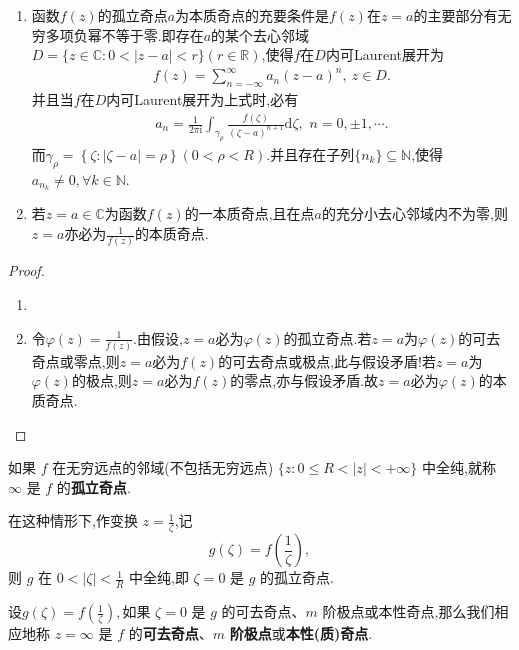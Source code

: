 \documentclass[../../main.tex]{subfiles}%
\begin{document}
\begin{theorem}
\begin{enumerate}[(1)]
\item 函数$f(z)$的孤立奇点$a$为本质奇点的充要条件是$f(z)$在$z=a$的主要部分有无穷多项负幂不等于零.即存在$a$的某个去心邻域$D=\{z\in \mathbb{C} :0<\left| z-a \right|<r\}(r\in \mathbb{R} )$,使得\( f \)在$D$内可Laurent展开为
\begin{align*}
f(z)=\sum_{n=-\infty}^{\infty}{a_n (z-a)^n},\ z\in D.
\end{align*}
并且当\( f \)在$D$内可Laurent展开为上式时,必有
\begin{align*}
a_n=\frac{1}{2\pi \mathrm{i}}\int_{\gamma _{\rho}}{\frac{f\left( \zeta \right)}{(\zeta-a)^{n+1}}\mathrm{d}\zeta},\,\,n=0,\pm 1,\cdots .
\end{align*}
而$\gamma _{\rho}=\left\{ \zeta :\left| \zeta-a \right|=\rho \right\}(0<\rho <R) .$并且存在子列$\{n_k\}\subseteq \mathbb{N}$,使得$a_{n_k}\neq 0,\forall k\in \mathbb{N}.$

\item 若$z=a\in \mathbb{C}$为函数$f(z)$的一本质奇点,且在点$a$的充分小去心邻域内不为零,则$z=a$亦必为$\frac{1}{f(z)}$的本质奇点.
\end{enumerate}
\end{theorem}
\begin{proof}
\begin{enumerate}[(1)]
\item 
    
\item 令$\varphi(z)=\frac{1}{f(z)}$.由假设,$z=a$必为$\varphi(z)$的孤立奇点.若$z=a$为$\varphi(z)$的可去奇点或零点,则$z=a$必为$f(z)$的可去奇点或极点,此与假设矛盾!若$z=a$为$\varphi(z)$的极点,则$z=a$必为$f(z)$的零点,亦与假设矛盾.故$z=a$必为$\varphi(z)$的本质奇点.
\end{enumerate}
\end{proof}

\begin{definition}
如果 \( f \) 在无穷远点的邻域(不包括无穷远点) \( \{ z: 0 \leqslant R < |z| < +\infty \} \) 中全纯,就称 \( \infty \) 是 \( f \) 的\textbf{孤立奇点}.
\end{definition}
\begin{remark}
在这种情形下,作变换 \( z = \frac{1}{\zeta} \),记
\[
g(\zeta) = f\left( \frac{1}{\zeta} \right),
\]
则 \( g \) 在 \( 0 < |\zeta| < \frac{1}{R} \) 中全纯,即 \( \zeta = 0 \) 是 \( g \) 的孤立奇点.
\end{remark}

\begin{definition}
设$g(\zeta) = f\left( \frac{1}{\zeta} \right),$如果 \( \zeta = 0 \) 是 \( g \) 的可去奇点、\( m \) 阶极点或本性奇点,那么我们相应地称 \( z = \infty \) 是 \( f \) 的\textbf{可去奇点}、\( m \) \textbf{阶极点}或\textbf{本性(质)奇点}.
\end{definition}
\end{document}
